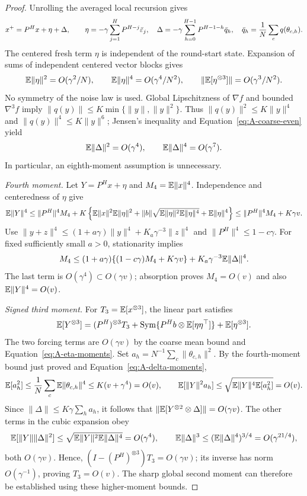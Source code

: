 \begin{proof}
Unrolling the averaged local recursion gives
\begin{equation}
\label{eq:A-round-exact}
 x^+=P^Hx+\eta+\Delta,\qquad
 \eta=-\gamma\sum_{j=1}^HP^{H-j}\bar{\varepsilon}_j,\quad
 \Delta=-\gamma\sum_{h=0}^{H-1}P^{H-1-h}\bar q_h,
 \quad \bar q_h=\frac1N\sum_c q(\theta_{c,h}).
\end{equation}
The centered fresh term $\eta$ is independent of the round-start state.
Expansion of sums of independent centered vector blocks gives
\begin{equation}
\label{eq:A-eta-moments}
 \mathbb{E}\|\eta\|^2=O(\gamma^2/N),\qquad
 \mathbb{E}\|\eta\|^4=O(\gamma^4/N^2),\qquad
 \|\mathbb{E}[\eta^{\otimes3}]\|=O(\gamma^3/N^2).
\end{equation}
No symmetry of the noise law is used. Global Lipschitzness of $\nabla f$
and bounded $\nabla^3f$ imply $\|q(y)\|\le K\min\{\|y\|,\|y\|^2\}$.
Thus $\|q(y)\|^2\le K\|y\|^4$ and $\|q(y)\|^4\le K\|y\|^6$;
Jensen's inequality and Equation~\eqref{eq:A-coarse-even} yield
\begin{equation}
\label{eq:A-Delta-moments}
 \mathbb{E}\|\Delta\|^2=O(\gamma^4),\qquad \mathbb{E}\|\Delta\|^4=O(\gamma^7).
\end{equation}
In particular, an eighth-moment assumption is unnecessary.

\emph{Fourth moment.}
Let $Y=P^Hx+\eta$ and $M_4=\mathbb{E}\|x\|^4$.
Independence and centeredness of $\eta$ give
\[
 \mathbb{E}\|Y\|^4\le\|P^H\|^4M_4+
 K\left\{\mathbb{E}\|x\|^2\mathbb{E}\|\eta\|^2
 +\|b\|\sqrt{\mathbb{E}\|\eta\|^2\mathbb{E}\|\eta\|^4}+\mathbb{E}\|\eta\|^4\right\}
 \le\|P^H\|^4M_4+K\gamma v.
\]
Use $\|y+z\|^4\le(1+a\gamma)\|y\|^4+K_a\gamma^{-3}\|z\|^4$
and $\|P^H\|^4\le1-c\gamma$. For fixed sufficiently small $a>0$,
stationarity implies
\[
 M_4\le(1+a\gamma)\{(1-c\gamma)M_4+K\gamma v\}
      +K_a\gamma^{-3}\mathbb{E}\|\Delta\|^4.
\]
The last term is $O(\gamma^4)\subset O(\gamma v)$; absorption proves
$M_4=O(v)$ and also $\mathbb{E}\|Y\|^4=O(v)$.

\emph{Signed third moment.}
For $T_3=\mathbb{E}[x^{\otimes3}]$, the linear part satisfies
\[
 \mathbb{E}[Y^{\otimes3}]=(P^H)^{\otimes3}T_3
 +\operatorname{Sym}\{P^Hb\otimes\mathbb{E}[\eta\eta^\top]\}+\mathbb{E}[\eta^{\otimes3}].
\]
The two forcing terms are $O(\gamma v)$ by the coarse mean bound and
Equation~\eqref{eq:A-eta-moments}.
Set $a_h=N^{-1}\sum_c\|\theta_{c,h}\|^2$. By the fourth-moment bound
just proved and Equation~\eqref{eq:A-delta-moments},
\[
 \mathbb{E}[a_h^2]\le\frac1N\sum_c\mathbb{E}\|\theta_{c,h}\|^4
 \le K(v+\gamma^4)=O(v),\qquad
 \mathbb{E}[\|Y\|^2a_h]\le\sqrt{\mathbb{E}\|Y\|^4\mathbb{E}[a_h^2]}=O(v).
\]
Since $\|\Delta\|\le K\gamma\sum_ha_h$, it follows that
$\|\mathbb{E}[Y^{\otimes2}\otimes\Delta]\|=O(\gamma v)$.
The other terms in the cubic expansion obey
\[
 \mathbb{E}[\|Y\|\|\Delta\|^2]\le
 \sqrt{\mathbb{E}\|Y\|^2\mathbb{E}\|\Delta\|^4}=O(\gamma^4),\qquad
 \mathbb{E}\|\Delta\|^3\le(\mathbb{E}\|\Delta\|^4)^{3/4}=O(\gamma^{21/4}),
\]
both $O(\gamma v)$. Hence,
$(I-(P^H)^{\otimes3})T_3=O(\gamma v)$; its inverse has norm
$O(\gamma^{-1})$, proving $T_3=O(v)$. The sharp global second moment can
therefore be established using these higher-moment bounds.
\end{proof}

